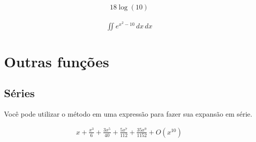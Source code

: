 \documentclass[letterpaper,10pt,english]{jupyterBook}
\begin{document}
\begin{sphinxVerbatim}[commandchars=\\\{\}]
\end{sphinxVerbatim}
\begin{equation*}
\begin{split}\displaystyle 18 \log{\left(10 \right)}\end{split}
\end{equation*}
\begin{sphinxVerbatim}[commandchars=\\\{\}]
    
\end{sphinxVerbatim}
\begin{equation*}
\begin{split}\displaystyle \iint e^{x^{2} - 10}\, dx\, dx\end{split}
\end{equation*}

\section{Outras funções}
\label{\detokenize{chapters/4:outras-funcoes}}

\subsection{Séries}
\label{\detokenize{chapters/4:series}}
\sphinxAtStartPar
Você pode utilizar o método  em uma expressão para fazer sua expansão em série.

\begin{sphinxVerbatim}[commandchars=\\\{\}]
  
\end{sphinxVerbatim}
\begin{equation*}
\begin{split}\displaystyle x + \frac{x^{3}}{6} + \frac{3 x^{5}}{40} + \frac{5 x^{7}}{112} + \frac{35 x^{9}}{1152} + O\left(x^{10}\right)\end{split}
\end{equation*}
\end{document}
